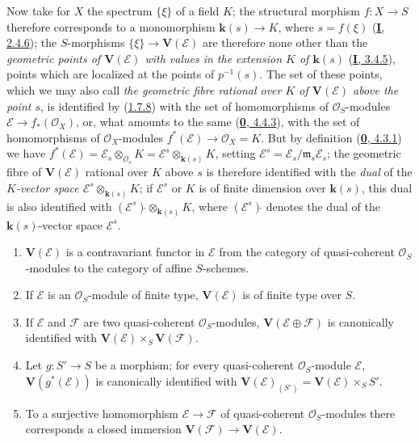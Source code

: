 \begin{env}[1.7.10]
\label{II.1.7.10}
Now take for $X$ the spectrum $\{\xi\}$ of a field $K$; the
structural morphism $f:X\to S$ therefore corresponds to a monomorphism
$\boldsymbol{k}(s)\to K$, where $s=f(\xi)$
(\hyperref[I.2.4.6]{\textbf{I}, 2.4.6}); the $S$-morphisms
$\{\xi\}\to\mathbf{V}(\mathcal{E})$ are therefore none other than the
\emph{geometric points of $\mathbf{V}(\mathcal{E})$ with values in
the extension $K$ of $\boldsymbol{k}(s)$} (\hyperref[I.3.4.5]{\textbf{I}, 3.4.5}), points
which are localized at the points of $p^{-1}(s)$. The set of these points,
which we may also call \emph{the geometric fibre rational over $K$ of
$\mathbf{V}(\mathcal{E})$ above the point $s$}, is identified by
(\hyperref[II.1.7.8]{1.7.8}) with the set of homomorphisms of
$\mathcal{O}_S$-modules
$\mathcal{E}\to f_*(\mathcal{O}_X)$, or, what amounts to the same
(\hyperref[0.4.4.3]{\textbf{0}, 4.4.3}), with the set of homomorphisms of
$\mathcal{O}_X$-modules
$f^*(\mathcal{E})\to\mathcal{O}_X=K$. But by definition
(\hyperref[0.4.3.1]{\textbf{0}, 4.3.1}) we have
$f^*(\mathcal{E})=\mathcal{E}_s\otimes_{\mathcal{O}_s}K
=\mathcal{E}^s\otimes_{\boldsymbol{k}(s)}K$, setting
$\mathcal{E}^s=\mathcal{E}_s/\mathfrak{m}_s\mathcal{E}_s$; the geometric
fibre of $\mathbf{V}(\mathcal{E})$ rational over $K$ above
$s$ is therefore identified with the \emph{dual} of the \emph{$K$-vector
space $\mathcal{E}^s\otimes_{\boldsymbol{k}(s)}K$}; if $\mathcal{E}^s$ or $K$ is of
finite dimension over $\boldsymbol{k}(s)$, this dual is also identified with
$(\mathcal{E}^s)\check{}\otimes_{\boldsymbol{k}(s)}K$, where
$(\mathcal{E}^s)\check{}$ denotes the dual of the $\boldsymbol{k}(s)$-vector space
$\mathcal{E}^s$.
\end{env}

\begin{proposition}[1.7.11]
\label{II.1.7.11}
\begin{enumerate}
  \item[\rm(i)] $\mathbf{V}(\mathcal{E})$ is a contravariant functor in
    $\mathcal{E}$ from the category of quasi-coherent
    $\mathcal{O}_S$-modules to the category of affine $S$-schemes.
  \item[\rm(ii)] If $\mathcal{E}$ is an $\mathcal{O}_S$-module of finite
    type, $\mathbf{V}(\mathcal{E})$ is of finite type over $S$.
  \item[\rm(iii)] If $\mathcal{E}$ and $\mathcal{F}$ are two
    quasi-coherent $\mathcal{O}_S$-modules,
    $\mathbf{V}(\mathcal{E}\oplus\mathcal{F})$ is canonically identified
    with $\mathbf{V}(\mathcal{E})\times_S\mathbf{V}(\mathcal{F})$.
  \item[\rm(iv)] Let $g:S'\to S$ be a morphism; for every
    quasi-coherent $\mathcal{O}_S$-module $\mathcal{E}$,
    $\mathbf{V}(g^*(\mathcal{E}))$ is canonically identified with
    $\mathbf{V}(\mathcal{E})_{(S')}
    =\mathbf{V}(\mathcal{E})\times_S S'$.
  \item[\rm(v)] To a surjective homomorphism
    $\mathcal{E}\to\mathcal{F}$ of quasi-coherent $\mathcal{O}_S$-modules
    there corresponds a closed immersion
    $\mathbf{V}(\mathcal{F})\to\mathbf{V}(\mathcal{E})$.
\end{enumerate}
\end{proposition}

